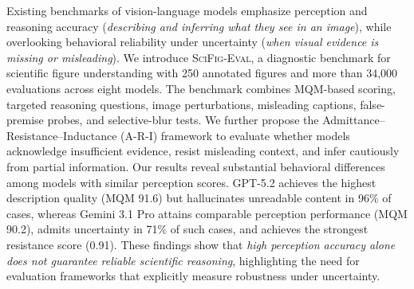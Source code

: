 Existing benchmarks of vision-language models emphasize perception and reasoning accuracy (\textit{describing and inferring what they see in an image}), while overlooking behavioral reliability under uncertainty (\textit{when visual evidence is missing or misleading}). We introduce \textsc{SciFig-Eval}, a diagnostic benchmark for scientific figure understanding with 250 annotated figures and more than 34,000 evaluations across eight models. The benchmark combines MQM-based scoring, targeted reasoning questions, image perturbations, misleading captions, false-premise probes, and selective-blur tests. We further propose the Admittance--Resistance--Inductance (A-R-I) framework to evaluate whether models acknowledge insufficient evidence, resist misleading context, and infer cautiously from partial information. Our results reveal substantial behavioral differences among models with similar perception scores. GPT-5.2 achieves the highest description quality (MQM 91.6) but hallucinates unreadable content in 96\% of cases, whereas Gemini 3.1 Pro attains comparable perception performance (MQM 90.2), admits uncertainty in 71\% of such cases, and achieves the strongest resistance score (0.91). These findings show that \textit{high perception accuracy alone does not guarantee reliable scientific reasoning}, highlighting the need for evaluation frameworks that explicitly measure robustness under uncertainty. %

